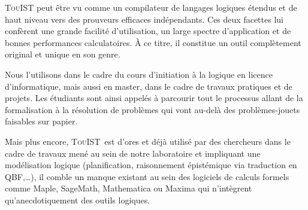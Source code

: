 \documentclass{iaf}
\newcommand{\touist}{\textsc{TouIST}\xspace}
\begin{document}
\touist peut être vu comme un compilateur de langages logiques étendus et de haut niveau vers des prouveurs efficaces indépendants. Ces deux facettes lui confèrent une grande facilité d'utilisation, un large spectre d'application et de bonnes performances calculatoires. À ce titre, il constitue un outil complètement original et unique en son genre. 

Nous l'utilisons dans le cadre du cours d'initiation à la logique en %
licence d'informatique, mais aussi en master, dans le cadre de travaux pratiques et de projets. Les étudiants sont ainsi appelés à parcourir tout le processus allant de la formalisation à la résolution de problèmes qui vont au-delà des problèmes-jouets faisables sur papier. 

Mais plus encore, \touist\ est d'ores et déjà  utilisé par des chercheurs dans le cadre de travaux mené au sein de notre laboratoire et impliquant une modélisation logique (planification, raisonnement épistémique via traduction en QBF,\ldots), il comble un manque existant au sein des logiciels de calculs formels comme Maple, SageMath, Mathematica ou Maxima qui n'intègrent qu'anecdotiquement des outils logiques.


\appendix



\end{document}

